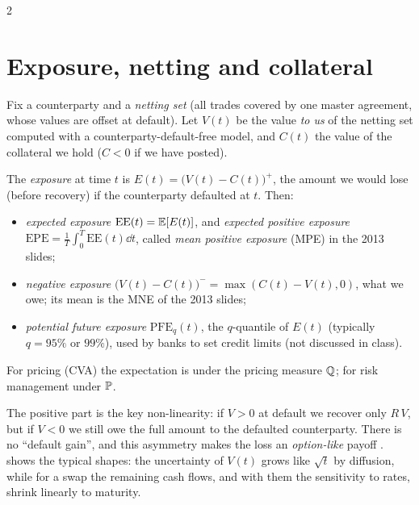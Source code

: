 \begin{paracol}{2}
\section{Exposure, netting and collateral}\label{ch08:sec-exposure}

Fix a counterparty and a \emph{netting set} (all trades covered by one master agreement, whose values are
offset at default). Let $V(t)$ be the value \emph{to us} of the netting set computed with a
counterparty-default-free model, and $C(t)$ the value of the collateral we hold ($C<0$ if we have posted).

\begin{definition}\label{ch08:def-exposure}
The \emph{exposure} at time $t$ is $E(t)=\bigl(V(t)-C(t)\bigr)^+$, the amount we would lose (before
recovery) if the counterparty defaulted at $t$. Then:
\begin{itemize}
  \item \emph{expected exposure} $\mathrm{EE}(t)=\mathbb{E}[E(t)]$, and \emph{expected positive exposure}
        $\mathrm{EPE}=\frac1T\int_0^T\mathrm{EE}(t)\dd t$, called \emph{mean positive exposure} (MPE) in the 2013
        slides;
  \item \emph{negative exposure} $\bigl(V(t)-C(t)\bigr)^-=\max(C(t)-V(t),0)$, what we owe; its mean is the MNE of
        the 2013 slides;
  \item \emph{potential future exposure} $\mathrm{PFE}_q(t)$, the $q$-quantile of $E(t)$ (typically $q=95\%$
        or $99\%$), used by banks to set credit limits (not discussed in class).
\end{itemize}
For pricing (CVA) the expectation is under the pricing measure $\mathbb{Q}$; for risk management under $\mathbb{P}$.
\end{definition}

The positive part is the key non-linearity: if $V>0$ at default we recover only $R\,V$, but if $V<0$ we
still owe the full amount to the defaulted counterparty. There is no ``default gain'', and this asymmetry
makes the loss an \emph{option-like} payoff .  shows the typical
shapes: the uncertainty of $V(t)$ grows like $\sqrt t$ by diffusion, while for a swap the remaining cash flows,
and with them the sensitivity to rates, shrink linearly to maturity.


\end{paracol}
